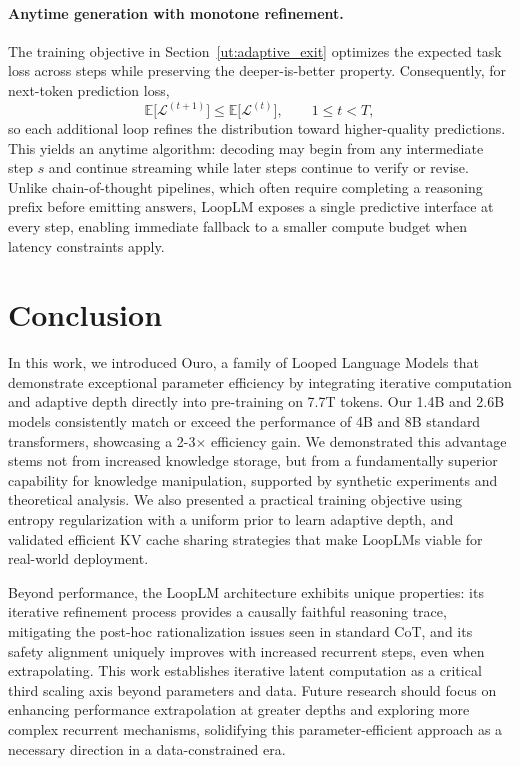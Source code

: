 \documentclass[]{bytedance_seed}
\newcommand{\1}{\mathbf{1}}
\newcommand{\ut}{LoopLM}
\begin{document}
{\paragraph{Anytime generation with monotone refinement.}
The training objective in Section~\ref{ut:adaptive_exit} optimizes the expected task loss across steps while preserving the deeper-is-better property. Consequently, for next-token prediction loss,
\[
\mathbb{E}\big[\mathcal{L}^{(t+1)}\big] \le \mathbb{E}\big[\mathcal{L}^{(t)}\big], \qquad 1 \le t < T,
\]
so each additional loop refines the distribution toward higher-quality predictions. This yields an anytime algorithm: decoding may begin from any intermediate step $s$ and continue streaming while later steps continue to verify or revise. Unlike chain-of-thought pipelines, which often require completing a reasoning prefix before emitting answers, \ut{} exposes a single predictive interface at every step, enabling immediate fallback to a smaller compute budget when latency constraints apply.

\section{Conclusion}

In this work, we introduced Ouro, a family of Looped Language Models that demonstrate exceptional parameter efficiency by integrating iterative computation and adaptive depth directly into pre-training on 7.7T tokens. Our 1.4B and 2.6B models consistently match or exceed the performance of 4B and 8B standard transformers, showcasing a 2-3$\times$ efficiency gain. We demonstrated this advantage stems not from increased knowledge storage, but from a fundamentally superior capability for knowledge manipulation, supported by synthetic experiments and theoretical analysis. We also presented a practical training objective using entropy regularization with a uniform prior to learn adaptive depth, and validated efficient KV cache sharing strategies that make \ut{}s viable for real-world deployment.

Beyond performance, the \ut{} architecture exhibits unique properties: its iterative refinement process provides a causally faithful reasoning trace, mitigating the post-hoc rationalization issues seen in standard CoT, and its safety alignment uniquely improves with increased recurrent steps, even when extrapolating. This work establishes iterative latent computation as a critical third scaling axis beyond parameters and data. Future research should focus on enhancing performance extrapolation at greater depths and exploring more complex recurrent mechanisms, solidifying this parameter-efficient approach as a necessary direction in a data-constrained era.

}
\end{document}
